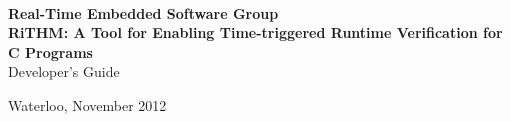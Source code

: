 \thispagestyle {empty}


\begin{center}
\noindent \HRule{1.5mm} \\[5mm]

  \noindent \normalsize \textbf{Real-Time Embedded Software Group} \\[2mm]
    \noindent \Large \textbf{RiTHM: A Tool for Enabling Time-triggered Runtime Verification for C Programs}\\[4mm]
    \noindent \large Developer's Guide

  \noindent \HRule{1.5mm}

  \vspace*{2cm}





  Waterloo, November 2012\\

  \end{center}












  \newpage